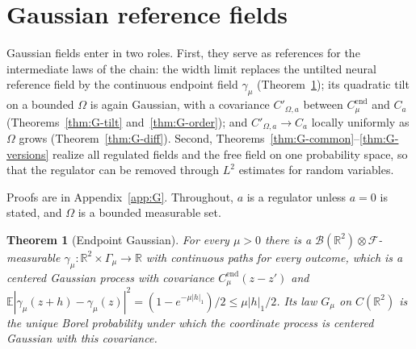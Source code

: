 \documentclass[11pt]{article}
\theoremstyle{plain}
\newtheorem{theorem}{Theorem}[section]
\theoremstyle{definition}
\theoremstyle{remark}
\newcommand{\R}{\mathbb{R}}
\newcommand{\E}{\mathbb{E}}
\newcommand{\cB}{\mathcal{B}}
\newcommand{\cF}{\mathcal{F}}
\newcommand{\Cend}{C^{\mathrm{end}}_{\mu}}
\begin{document}
\section{Gaussian reference fields}\label{sec:gauss}

Gaussian fields enter in two roles. First, they serve as references for the intermediate laws of the chain: the width limit replaces the untilted neural reference field by the continuous endpoint field $\gamma_\mu$ (Theorem~\ref{thm:G-endpoint}); its quadratic tilt on a bounded $\Omega$ is again Gaussian, with a covariance $C'_{\Omega,a}$ between $\Cend$ and $C_a$ (Theorems~\ref{thm:G-tilt} and~\ref{thm:G-order}); and $C'_{\Omega,a}\to C_a$ locally uniformly as $\Omega$ grows (Theorem~\ref{thm:G-diff}). Second, Theorems~\ref{thm:G-common}--\ref{thm:G-versions} realize all regulated fields and the free field on one probability space, so that the regulator can be removed through $L^{2}$ estimates for random variables.

Proofs are in Appendix~\ref{app:G}. Throughout, $a$ is a regulator unless $a=0$
is stated, and $\Omega$ is a bounded measurable set.

\begin{theorem}[Endpoint Gaussian]\label{thm:G-endpoint}
For every $\mu>0$ there is a $\cB(\R^{2})\otimes\cF$-measurable
$\gamma_\mu:\R^{2}\times\Gamma_\mu\to\R$ with continuous paths for every outcome, which
is a centered Gaussian process with covariance $\Cend(z-z')$ and
$\E|\gamma_\mu(z+h)-\gamma_\mu(z)|^{2}=(1-e^{-\mu|h|_1})/2\le\mu|h|_1/2$. Its law $G_\mu$ on
$C(\R^{2})$ is the unique Borel probability under which the coordinate process is
centered Gaussian with this covariance.
\end{theorem}
\end{document}
